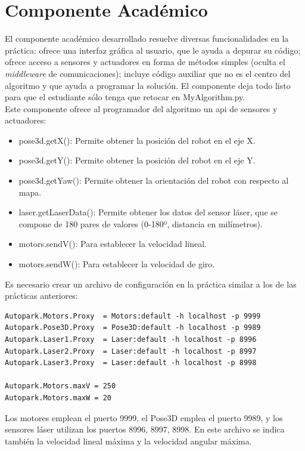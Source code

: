\section{Componente Académico}
El componente académico desarrollado resuelve diversas funcionalidades en la práctica: ofrece una interfaz gráfica al usuario, que le ayuda a depurar su código; ofrece acceso a sensores y actuadores en forma de métodos simples (oculta el \textit{middleware} de comunicaciones); incluye código auxiliar que no es el centro del algoritmo y que ayuda a programar la solución. El componente deja todo listo para que el estudiante sólo tenga que retocar en MyAlgorithm.py.\\

Este componente ofrece al programador del algoritmo un \acrshort{api} de sensores y actuadores:

\begin{itemize}
\item pose3d.getX(): Permite obtener la posición del robot en el eje X.
\item	pose3d.getY(): Permite obtener la posición del robot en el eje Y.
\item	pose3d.getYaw(): Permite obtener la orientación del robot con respecto al mapa.
\item	laser.getLaserData(): Permite obtener los datos del sensor láser, que se compone de 180 pares de valores (0-180º, distancia en milímetros).
\item motors.sendV(): Para establecer la velocidad lineal.
\item	motors.sendW(): Para establecer la velocidad de giro.
\end{itemize}

Es necesario crear un archivo de configuración en la práctica similar a los de las prácticas anteriores:

\vspace{20pt}
	\begin{lstlisting}[frame=single]
Autopark.Motors.Proxy  = Motors:default -h localhost -p 9999
Autopark.Pose3D.Proxy  = Pose3D:default -h localhost -p 9989
Autopark.Laser1.Proxy  = Laser:default -h localhost -p 8996
Autopark.Laser2.Proxy  = Laser:default -h localhost -p 8997
Autopark.Laser3.Proxy  = Laser:default -h localhost -p 8998

Autopark.Motors.maxV = 250
Autopark.Motors.maxW = 20

	\end{lstlisting}


Los motores emplean el puerto 9999, el Pose3D emplea el puerto 9989, y los sensores láser utilizan los puertos 8996, 8997, 8998. En este archivo se indica también la velocidad lineal máxima y la velocidad angular máxima.\\

